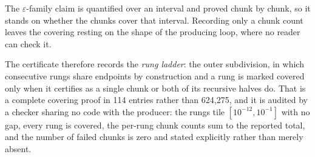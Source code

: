 \documentclass[11pt]{article}
\begin{document}
The $\varepsilon$-family claim is quantified over an interval and proved chunk
by chunk, so it stands on whether the chunks cover that interval. Recording only
a chunk count leaves the covering resting on the shape of the producing loop,
where no reader can check it.

The certificate therefore records the \emph{rung ladder}: the outer
subdivision, in which consecutive rungs share endpoints by construction and a
rung is marked covered only when it certifies as a single chunk or both of its
recursive halves do. That is a complete covering proof in 114
entries rather than 624,275,
and it is audited by a checker sharing no code with the producer: the rungs tile
$[10^{-12}, 10^{-1}]$ with no gap, every rung is covered, the per-rung chunk
counts sum to the reported total, and the number of failed chunks is zero and
stated explicitly rather than merely absent.
\end{document}
